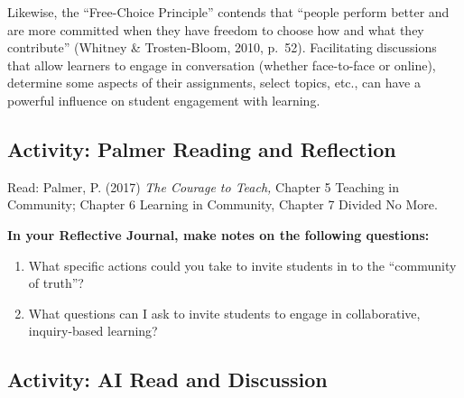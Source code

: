 \documentclass[
]{book}
\providecommand{\tightlist}{%
  \setlength{\itemsep}{0pt}\setlength{\parskip}{0pt}}
\begin{document}
Likewise, the ``Free-Choice Principle'' contends that ``people perform better and are more committed when they have freedom to choose how and what they contribute'' (Whitney \& Trosten-Bloom, 2010, p.~52). Facilitating discussions that allow learners to engage in conversation (whether face-to-face or online), determine some aspects of their assignments, select topics, etc., can have a powerful influence on student engagement with learning.

\hypertarget{activity-palmer-reading-and-reflection-1}{%
\subsection*{Activity: Palmer Reading and Reflection}\label{activity-palmer-reading-and-reflection-1}}

\begin{reflect}
Read: Palmer, P. (2017) \emph{The Courage to Teach,} Chapter 5 Teaching
in Community; Chapter 6 Learning in Community, Chapter 7 Divided No
More.

\textbf{In your Reflective Journal, make notes on the following
questions:}

\begin{enumerate}
\def\labelenumi{\arabic{enumi}.}
\tightlist
\item
  What specific actions could you take to invite students in to the
  ``community of truth''?
\item
  What questions can I ask to invite students to engage in
  collaborative, inquiry-based learning?
\end{enumerate}
\end{reflect}

\hypertarget{activity-ai-read-and-discussion}{%
\subsection*{Activity: AI Read and Discussion}\label{activity-ai-read-and-discussion}}
\end{document}
